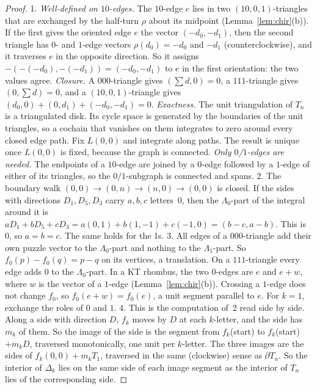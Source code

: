\documentclass[11pt]{article}
\theoremstyle{definition}\newtheorem{definition}[theorem]{Definition}\newtheorem{remark}[theorem]{Remark}
\begin{document}
\begin{proof}
1. \emph{Well-defined on $10$-edges.} The $10$-edge $e$ lies in two $(10,0,1)$-triangles that are exchanged by the half-turn $\rho$ about its midpoint (Lemma~\ref{lem:chir}(b)). If the first gives the oriented edge $e$ the vector $(-d_0,-d_1)$, then the second triangle has $0$- and $1$-edge vectors $\rho(d_0)=-d_0$ and $-d_1$ (counterclockwise), and it traverses $e$ in the opposite direction. So it assigns $-(-(-d_0),-(-d_1))=(-d_0,-d_1)$ to $e$ in the first orientation: the two values agree. \emph{Closure.} A $000$-triangle gives $(\sum d,0)=0$, a $111$-triangle gives $(0,\sum d)=0$, and a $(10,0,1)$-triangle gives $(d_0,0)+(0,d_1)+(-d_0,-d_1)=0$. \emph{Exactness.} The unit triangulation of $T_n$ is a triangulated disk. Its cycle space is generated by the boundaries of the unit triangles, so a cochain that vanishes on them integrates to zero around every closed edge path. Fix $L(0,0)$ and integrate along paths. The result is unique once $L(0,0)$ is fixed, because the graph is connected. \emph{Only $0$/$1$-edges are needed.} The endpoints of a $10$-edge are joined by a $0$-edge followed by a $1$-edge of either of its triangles, so the $0/1$-subgraph is connected and spans.
2. The boundary walk $(0,0)\to(0,n)\to(n,0)\to(0,0)$ is closed. If the sides with directions $D_1,D_5,D_3$ carry $a,b,c$ letters~0, then the $\Lambda_0$-part of the integral around it is $aD_1+bD_5+cD_3=a(0,1)+b(1,-1)+c(-1,0)=(b-c,a-b)$. This is $0$, so $a=b=c$. The same holds for the 1s.
3. All edges of a $000$-triangle add their own puzzle vector to the $\Lambda_0$-part and nothing to the $\Lambda_1$-part. So $f_0(p)-f_0(q)=p-q$ on its vertices, a translation. On a $111$-triangle every edge adds $0$ to the $\Lambda_0$-part. In a KT rhombus, the two $0$-edges are $e$ and $e+w$, where $w$ is the vector of a $1$-edge (Lemma~\ref{lem:chir}(b)). Crossing a $1$-edge does not change $f_0$, so $f_0(e+w)=f_0(e)$, a unit segment parallel to $e$. For $k=1$, exchange the roles of $0$ and $1$.
4. This is the computation of~2 read side by side. Along a side with direction $D$, $f_k$ moves by $D$ at each $k$-letter, and the side has $m_k$ of them. So the image of the side is the segment from $f_k$(start) to $f_k$(start)$+m_kD$, traversed monotonically, one unit per $k$-letter. The three images are the sides of $f_k(0,0)+m_kT_1$, traversed in the same (clockwise) sense as $\partial T_n$. So the interior of $\Delta_k$ lies on the same side of each image segment as the interior of $T_n$ lies of the corresponding side.
\end{proof}
\end{document}
